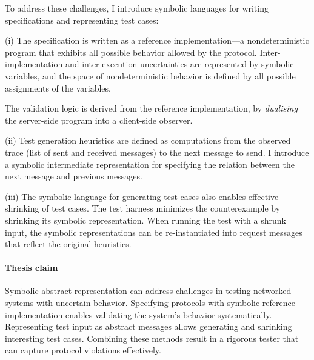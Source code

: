 \documentclass{article}
\theoremstyle{definition}
\begin{document}
To address these challenges, I introduce symbolic languages for writing
specifications and representing test cases:

(i) The specification is written as a reference implementation---a
nondeterministic program that exhibits all possible behavior allowed by
the protocol.  Inter-implementation and inter-execution uncertainties are
represented by symbolic variables, and the space of nondeterministic behavior is
defined by all possible assignments of the variables.

The validation logic is derived from the reference implementation, by {\em
  dualising} the server-side program into a client-side observer.

(ii) Test generation heuristics are defined as computations from the observed
trace (list of sent and received messages) to the next message to send.  I
introduce a symbolic intermediate representation for specifying the relation
between the next message and previous messages.

(iii) The symbolic language for generating test cases also enables effective
shrinking of test cases.  The test harness minimizes the counterexample by
shrinking its symbolic representation.  When running the test with a shrunk
input, the symbolic representations can be re-instantiated into request messages
that reflect the original heuristics.

\paragraph{Thesis claim}
Symbolic abstract representation can address challenges in testing networked systems with uncertain behavior.
Specifying protocols with symbolic reference implementation enables validating
the system's behavior systematically.  Representing test input as abstract
messages allows generating and shrinking interesting test cases.  Combining
these methods result in a rigorous tester that can capture protocol violations
effectively.
\end{document}
